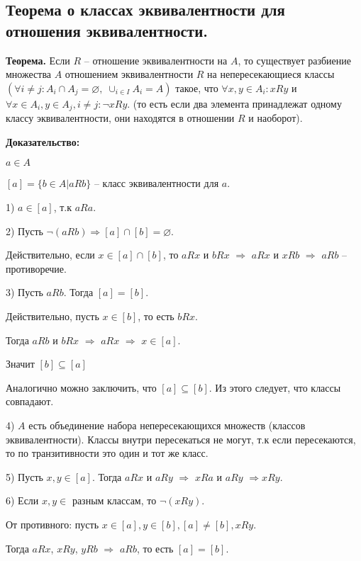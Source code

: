 \subsection{Теорема о классах эквивалентности для отношения эквивалентности.}

\textbf{Теорема.} Если $R$ -- отношение эквивалентности на $A$, то существует разбиение множества $A$ отношением эквивалентности $R$ на непересекающиеся классы $(\forall i \neq j \colon A_i \cap A_j = \varnothing,\; \cup_{i \in I} A_i = A)$ такое, что $\forall x, y \in A_i \colon xRy$ и $\forall x \in A_i, y \in A_j, i \neq j: \neg xRy$. (то есть если два элемента принадлежат одному классу эквивалентности, они находятся в отношении $R$ и наоборот).

\textbf{Доказательство:}

$a \in A$

$[a] = \{b \in A | aRb\}$ -- класс эквивалентности для $a$.

1) $a \in [a]$, т.к $aRa$.

2) Пусть $\neg (aRb) \Rightarrow [a] \cap [b] = \varnothing$.

Действительно, если $x \in [a] \cap [b]$, то $aRx$ и $bRx$ $\Rightarrow$ $aRx$ и $xRb$ 
$\Rightarrow$ $aRb$ -- противоречие.

3) Пусть $aRb$. Тогда $[a] = [b]$.

Действительно, пусть $x \in [b]$, то есть $bRx$.

Тогда $aRb$ и $bRx$ $\Rightarrow$ $aRx$ $\Rightarrow$ $x \in [a]$.

Значит $[b] \subseteq [a]$

Аналогично можно заключить, что $[a] \subseteq [b]$. Из этого следует, что классы совпадают.

4) $A$ есть объединение набора непересекающихся множеств (классов эквивалентности). Классы внутри пересекаться не могут, т.к если пересекаются, то по транзитивности это один и тот же класс.

5) Пусть $x, y \in [a]$. Тогда $aRx$ и $aRy$ $\Rightarrow$ $xRa$ и $aRy$ $\Rightarrow xRy$.

6) Если $x, y \in$ разным классам, то $\neg(xRy)$.

От противного: пусть $x \in [a], y \in [b], [a] \neq [b], xRy$.

Тогда $aRx$, $xRy$, $yRb$ $\Rightarrow$ $aRb$, то есть $[a] = [b]$.
